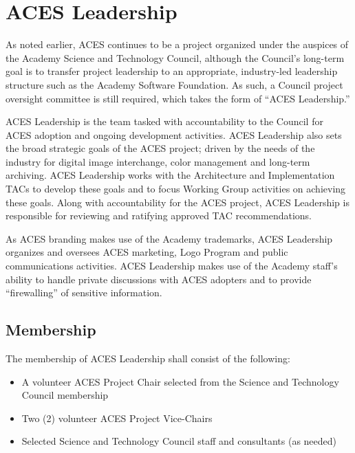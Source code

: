 \newpage
\section{ACES Leadership}
As noted earlier, ACES continues to be a project organized under the auspices of the Academy Science and Technology Council, although the Council's long-term goal is to transfer project leadership to an appropriate, industry-led leadership structure such as the Academy Software Foundation. As such, a Council project oversight committee is still required, which takes the form of ``ACES Leadership.'' 

ACES Leadership is the team tasked with accountability to the Council for ACES adoption and ongoing development activities. ACES Leadership also sets the broad strategic goals of the ACES project; driven by the needs of the industry for digital image interchange, color management and long-term archiving. ACES Leadership works with the Architecture and Implementation TACs to develop these goals and to focus Working Group activities on achieving these goals. Along with accountability for the ACES project, ACES Leadership is responsible for reviewing and ratifying approved TAC recommendations.

As ACES branding makes use of the Academy trademarks, ACES Leadership organizes and oversees ACES marketing, Logo Program and public communications activities. ACES Leadership makes use of the Academy staff's ability to handle private discussions with ACES adopters and to provide ``firewalling'' of sensitive information.



\subsection{Membership}
The membership of ACES Leadership shall consist of the following:
\begin{itemize}
    \item A volunteer ACES Project Chair selected from the Science and Technology Council membership
    \item Two (2) volunteer ACES Project Vice-Chairs
    \item Selected Science and Technology Council staff and consultants (as needed)
\end{itemize}

